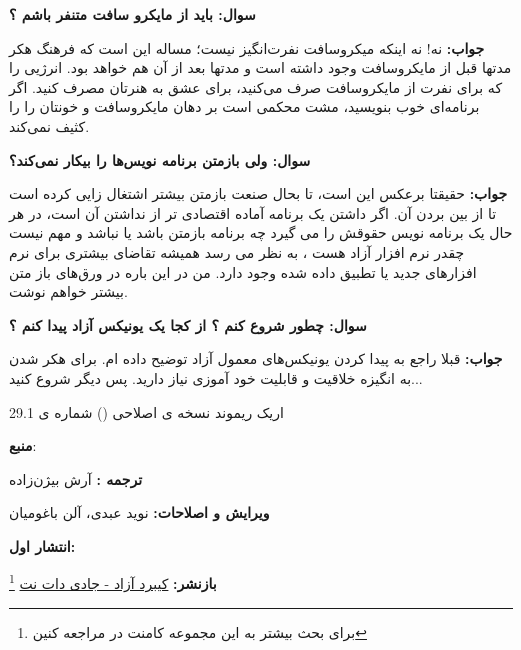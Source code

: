 \textbf{سوال:  باید از مایکرو سافت متنفر باشم ؟}

\textbf{جواب:} 
نه! نه اینکه میکروسافت نفرت‌انگیز نیست؛ مساله این است که فرهنگ هکر مدتها قبل از مایکروسافت وجود داشته است و مدتها بعد از آن هم خواهد بود. انرژیی را که برای نفرت از مایکروسافت صرف می‌کنید، برای عشق به هنرتان مصرف کنید. اگر برنامه‌ای خوب بنویسید، مشت محکمی است بر دهان مایکروسافت و خونتان را را کثیف نمی‌کند.

\textbf{سوال:  ولی بازمتن برنامه نویس‌ها را بیکار نمی‌کند؟}

\textbf{جواب:} 
حقیقتا برعکس این است، تا بحال صنعت بازمتن بیشتر اشتغال زایی کرده است تا از بین بردن آن. اگر داشتن یک برنامه آماده اقتصادی تر از نداشتن آن است، در هر حال یک برنامه نویس حقوقش را می گیرد چه برنامه بازمتن باشد یا نباشد و مهم نیست چقدر نرم افزار آزاد  هست ، به نظر می رسد همیشه تقاضای بیشتری برای نرم افزارهای جدید یا تطبیق داده شده وجود دارد. من در این باره در ورق‌های باز متن
بیشتر خواهم نوشت.

\textbf{سوال:  چطور شروع کنم ؟ از کجا یک یونیکس آزاد پیدا کنم ؟}

\textbf{جواب:} 
قبلا راجع به پیدا کردن یونیکس‌های معمول آزاد توضیح داده ام. برای هکر شدن به انگیزه خلاقیت و قابلیت خود آموزی نیاز دارید. پس دیگر شروع کنید...

\begin{flushleft}
	اریک ریموند نسخه ی اصلاحی () شماره ی 29.1
\end{flushleft}

\textbf{منبع}: 

\textbf{ترجمه :}
آرش بیژن‌زاده

\textbf{ویرایش و اصلاحات:}
نوید عبدی، آلن باغومیان

\textbf{انتشار اول:}
\href{http://www.technotux.com/html/Sections-article89-p1.html}{}

\textbf{بازنشر:}
\href{http://jadi.net}{کیبرد آزاد - جادی دات نت}
\footnote{برای بحث بیشتر به این مجموعه کامنت در\href{http://jadi.net/2011/01/saveshe-hacker-shodan/}{} مراجعه کنین}


